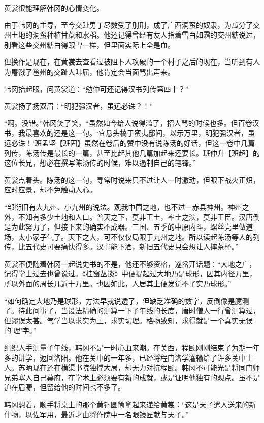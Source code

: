 黄裳很能理解韩冈的心情变化。

由于韩冈的主导，至今交趾男丁尽数受了刖刑，成了广西洞蛮的奴隶，为瓜分了交州土地的洞蛮种植甘蔗和水稻。他还记得曾经有友人指着雪白如霜的交州糖说过，别看这些交州糖白得跟雪一样，但里面实际上全是血。

但换作是现在，在黄裳去查看过被阻卜人攻破的一个村子之后的现在，当听到有人为屠戮了邕州的交趾人叫屈，他肯定会当面骂出声来。

韩冈抬起眼，问黄裳道：“勉仲可还记得汉书列传第四十？”

黄裳扬了扬双眉：“明犯强汉者，虽远必诛？！”

“啊。没错。”韩冈笑了笑，“虽然如今给人说得滥了，招人骂的时候也多。但百卷汉书，我最喜欢的还是这一句。‘宜悬头槁于蛮夷邸间，以示万里，明犯强汉者，虽远必诛！’班孟坚【班固】虽然在卷后的赞中没有说陈汤的好话，但这一卷中几篇列传，陈汤传是最长的一篇，甚至比起其他几篇加起来还要长。班仲升【班超】的这位长兄，想必在撰写陈汤传的时候，难以遏制自己的笔锋。”

黄裳点着头。陈汤的这一句，寻常时说来只不过让人一时激动，但眼下战火正炽，应时应景，却不免触动人心。

“邹衍旧有大九州、小九州的说法。观我中国之地，也不过一赤县神州。神州之外，不知有多少土地和人口。普天之下，莫非王土，率土之滨，莫非王臣。汉唐倒是为此努力了，但接下来的确实不成器。三国、五季的中原内斗，螺丝壳里做道场，太小家子气了。天下之大，可不仅仅局限于九州之地。所以读起陈汤等人的列传，比五代史可要痛快得多。汉书能下酒，新旧五代史只会想让人摔茶杯。”

黄裳不便随着韩冈一起说史书的不是，他还不够资格，遂岔开话题：“大地之广，记得学士过去也曾说过。《桂窗丛谈》中便提起过大地乃是球形，因其内径万里，所以外面的周长几近十万里。也因如此，人居其上便发觉不了实乃球形。”

“如何确定大地乃是球形，方法早就说透了，但缺乏准确的数字，反倒像是臆测了。待此间事了，当设法精确的测算一下子午线的长度，唐时僧人一行曾测算过，但谬误太甚。气学当以求实为上，求实切理。格物致知，求得就是一个真实无误的‘理’字。”

组织人手测量子午线，韩冈不是一时心血来潮。在关西，程颐刚刚结束了为期一年多的讲学，返回洛阳。他在关中的一年多，已经将程门洛学灌输给了许多关中士人。苏昞现在还在横渠书院独撑大局，却无力对抗程颐。韩冈不可能光是将同门师兄弟塞入自己幕府，在学术上必须要有新的成就，或是证明他独有的观点。虽不是迫在眉睫，但留给他的时间也不多了。

韩冈想着，顺手将桌上的那个黄铜圆筒拿起来递给黄裳：“这是天子遣人送来的新什物，以佐军用，最近才由将作院中一名眼镜匠献与天子。”

